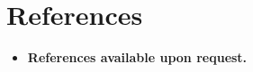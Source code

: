 \section{References}
    \begin{itemize}
        \item \textbf{References available upon request.}
    \end{itemize}
